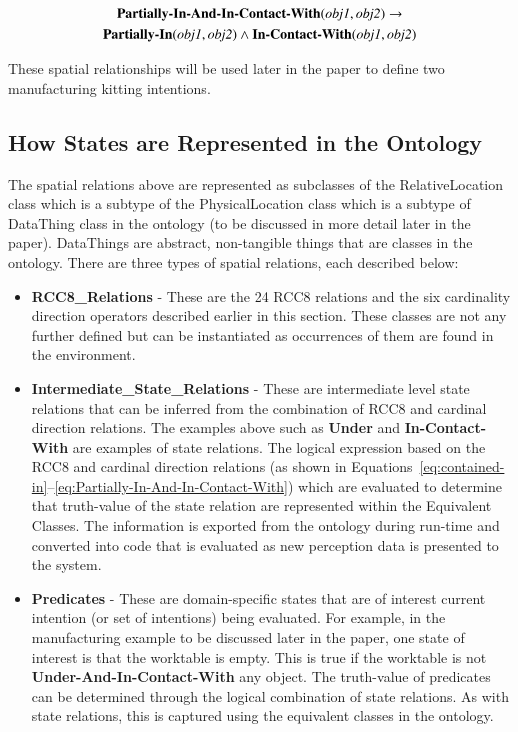 \documentclass[preprint,12pt]{elsarticle}
\newcommand{\sr}[1] {\textbf{#1}}
\newcommand{\class}[1] {\textsf{#1}}
\begin{document}
\begin{gather}
\label{eq:Partially-In-And-In-Contact-With}
\textbf{Partially-In-And-In-Contact-With}(\textit{obj1}, \textit{obj2}) \rightarrow\\
\textbf{Partially-In}(\textit{obj1}, \textit{obj2}) \wedge \textbf{In-Contact-With}(\textit{obj1}, \textit{obj2})\notag
\end{gather}

These spatial relationships will be used later in the paper to define two manufacturing kitting intentions.

\subsection{How States are Represented in the Ontology}
The spatial relations above are represented as subclasses of the \class{RelativeLocation} class which is a subtype of the \class{PhysicalLocation} class which is a subtype of \class{DataThing} class in the ontology (to be discussed in more detail later in the paper). \class{DataThings} are abstract, non-tangible things that are classes in the ontology. There are three types of spatial relations, each described below:
\begin{itemize}
\item \textbf{RCC8\_Relations} - These are the 24 RCC8 relations and the six cardinality direction operators described earlier in this section. These classes are not any further defined but can be instantiated as occurrences of them are found in the environment.
\item \textbf{Intermediate\_State\_Relations} - These are intermediate level state relations that can be inferred from the combination of RCC8 and cardinal direction relations. The examples above such as \sr{Under} and \sr{In-Contact-With} are examples of state relations. The logical expression based on the RCC8 and cardinal direction relations (as shown in Equations~\ref{eq:contained-in}--\ref{eq:Partially-In-And-In-Contact-With}) which are evaluated to determine that truth-value of the state relation are represented within the Equivalent Classes. The information is exported from the ontology during run-time and converted into code that is evaluated as new perception data is presented to the system.
\item \textbf{Predicates} - These are domain-specific states that are of interest current intention (or set of intentions) being evaluated. For example, in the manufacturing example to be discussed later in the paper, one state of interest is that the worktable is empty. This is true if the worktable is not \sr{Under-And-In-Contact-With} any object. The truth-value of predicates can be determined through the logical combination of state relations. As with state relations, this is captured using the equivalent classes in the ontology.
\end{itemize}
\end{document}
